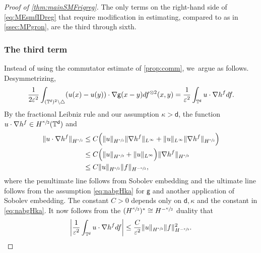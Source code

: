 \documentclass[JEP,XML,SOM,Unicode,published]{cedram}
\theoremstyle{plain}
\theoremstyle{definition}
\DeclarePairedDelimiter{\pa}{\lparen}{\rparen}
\newcommand{\T}{{\mathbb{T}}}
\let\vep\varepsilon
\let\ka\kappa
\let\nab\nabla
\renewcommand{\d}{\mathsf{d}}
\newcommand{\g}{{\mathsf{g}}}
\begin{document}
\begin{proof}[Proof of \cref{thm:mainSMFrigreg}]

The only terms on the right-hand side of \eqref{eq:MEsmfIDreg} that require modification in estimating, compared to as in \cref{ssec:MPgron}, are the third through sixth.

\subsubsection*{The third term}
Instead of using the commutator estimate of \cref{prop:comm}, we~argue as follows. Desymmetrizing,
\begin{align*}
\frac{1}{2\vep^2}\int_{(\T^\d)^2\setminus\triangle} \pa*{u(x)-u(y)}\cdot\nabla\g(x-y)df^{\otimes 2}(x,y)
=\frac{1}{\vep^2}\int_{\T^\d}u\cdot \nab h^{f}d f.
\end{align*}
By the fractional Leibniz rule and our assumption {$\ka>\d$}, the function $u\cdot\nab h^f \in H^{\sfrac{\ka}{2}}(\T^\d)$ and
\begin{align*}
\|u\cdot\nab h^f\|_{H^{\sfrac{\ka}{2}}} &\le C\Big(\|u\|_{H^{\sfrac{\ka}{2}}} \|\nab h^f\|_{L^\infty} + \|u\|_{L^\infty} \|\nab h^f\|_{H^{\sfrac{\ka}{2}}}\Big)\\
&\le C\Big(\|u\|_{H^{\sfrac{\ka}{2}}} + \|u\|_{L^\infty}\Big) \|\nab h^f\|_{H^{\sfrac{\ka}{2}}}\\
&\le C\|u\|_{H^{\sfrac{\ka}{2}}} \|f\|_{H^ {-\sfrac{\ka}{2}}},
\end{align*}
where the penultimate line follows from Sobolev embedding and the ultimate line follows from the assumption \eqref{eq:nabgHka} for $\g$ and another application of Sobolev embedding. The constant $C>0$ depends only on $\d,\ka$ and the constant in \eqref{eq:nabgHka}.
It now follows from the $(H^{\sfrac{\ka}{2}})^* \cong H^ {-\sfrac{\ka}{2}}$ duality that
\begin{equation}\label{eq:Gronreg1}
\bigg|\frac{1}{\vep^2}\int_{\T^\d}u\cdot \nab h^{f}d f\biggr| \le \frac{C}{\vep^2}\|u\|_{H^{\sfrac\ka2}}\|f\|_{H^{-\sfrac{\ka}2}}^2.
\end{equation}


\end{proof}
\end{document}
